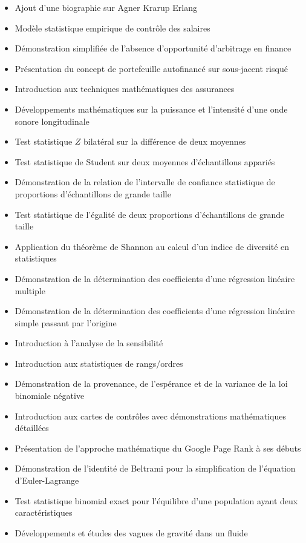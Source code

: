 \documentclass[12pt,a4paper,twoside,openright]{report}
\theoremstyle{definition}
\theoremstyle{itexmp}
\numberwithin{equation}{section}
\begin{document}
\begin{itemize}
\begin{itemize}[noitemsep]
				\item Ajout d'une biographie sur Agner Krarup Erlang
				\item Modèle statistique empirique de contrôle des salaires
				\item Démonstration simplifiée de l'absence d'opportunité d'arbitrage en finance
				\item Présentation du concept de portefeuille autofinancé sur sous-jacent risqué
				\item  Introduction aux techniques mathématiques des assurances
				\item Développements mathématiques sur la puissance et l'intensité d'une onde sonore longitudinale
				\item  Test statistique $Z$ bilatéral sur la différence de deux moyennes
				\item Test statistique de Student sur deux moyennes d'échantillons appariés
				\item Démonstration de la relation de l'intervalle de confiance statistique de proportions d'échantillons de grande taille
				\item Test statistique de l'égalité de deux proportions d'échantillons de grande taille
				\item Application du théorème de Shannon au calcul d'un indice de diversité en statistiques
				\item Démonstration de la détermination des coefficients d'une régression linéaire multiple
				\item Démonstration de la détermination des coefficients d'une régression linéaire simple passant par l'origine
				\item Introduction à l'analyse de la sensibilité
				\item Introduction aux statistiques de rangs/ordres
				\item Démonstration de la provenance, de l'espérance et de la variance de la loi binomiale négative
				\item Introduction aux cartes de contrôles avec démonstrations mathématiques détaillées
				\item Présentation de l'approche mathématique du Google Page Rank à ses débuts
				\item Démonstration de l'identité de Beltrami pour la simplification de l'équation d'Euler-Lagrange
				\item Test statistique binomial exact pour l'équilibre d'une population ayant deux caractéristiques
				\item Développements et études des vagues de gravité dans un fluide

\end{itemize}
\end{itemize}
\end{document}
